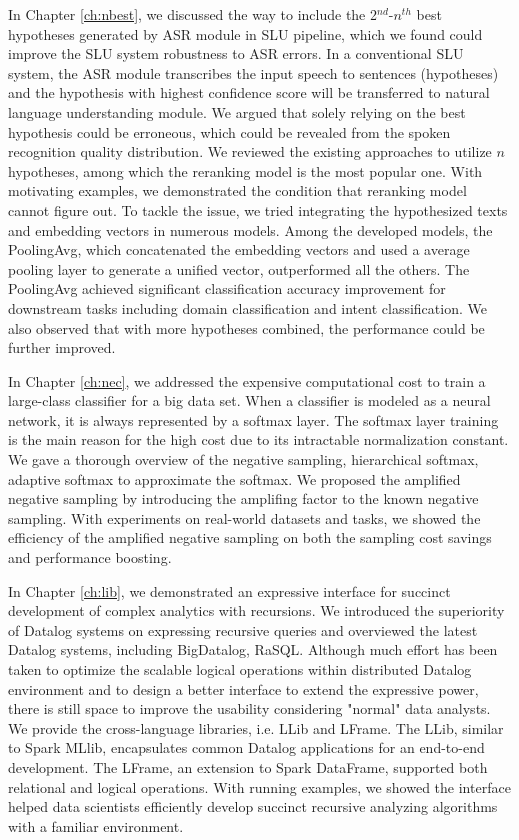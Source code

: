 \documentclass [PhD] {uclathes}
\begin{document}
In Chapter \ref{ch:nbest}, we discussed the way to include the 2$^{nd}$-$n^{th}$ best hypotheses generated by ASR module in SLU pipeline, which we found  could improve the SLU system robustness to ASR errors. In a conventional SLU system, the ASR module transcribes the input speech to sentences (hypotheses)  and the hypothesis with highest confidence score will be transferred to natural language understanding module. We argued that solely relying on the best hypothesis could be erroneous, which could be revealed from  the spoken recognition quality distribution. We reviewed the existing approaches to utilize $n$ hypotheses, among which  the reranking model is the most popular one. With motivating examples, we demonstrated the condition that reranking model cannot figure out. To tackle the issue, we tried integrating the hypothesized texts and embedding vectors in numerous models. Among the developed models, the PoolingAvg, which concatenated the embedding vectors and used a average pooling layer to generate a unified vector, outperformed all the others.  The PoolingAvg achieved significant classification accuracy improvement for downstream tasks including domain classification and intent classification. We also observed that with more hypotheses combined, the performance could be further improved. 

In Chapter \ref{ch:nec}, we addressed the expensive computational cost to train a large-class classifier for a big data set. When a classifier is modeled as a neural network, it is always represented by a softmax layer. The softmax layer training is the main reason for the high cost due to its intractable normalization constant. We gave a thorough overview of  the  negative sampling, hierarchical softmax, adaptive softmax to approximate the softmax.  We proposed the amplified negative sampling by introducing the amplifing factor to the known negative sampling. With experiments on real-world datasets and tasks, we showed the efficiency of the amplified negative sampling on both the sampling cost savings and performance  boosting. 

In Chapter \ref{ch:lib}, we demonstrated an expressive interface for succinct development of complex analytics with recursions.  We introduced the superiority of Datalog systems on expressing recursive queries and overviewed the latest Datalog systems, including BigDatalog, RaSQL. Although much effort has been taken to optimize the scalable logical operations  within distributed Datalog environment and to  design a better interface to extend the expressive power, there is still space to improve the usability considering  "normal" data analysts. We provide the cross-language libraries, i.e. LLib and LFrame. The LLib, similar to Spark MLlib,  encapsulates common Datalog applications for an end-to-end development. The LFrame, an extension to Spark DataFrame, supported both relational and logical operations. With running examples, we showed the interface helped data scientists  efficiently develop succinct recursive analyzing algorithms with a familiar environment.
\end{document}
